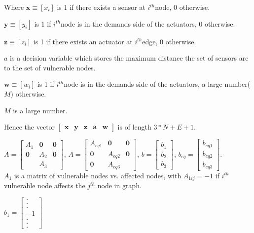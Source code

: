 \documentclass[authoryear,preprint,review,12pt]{elsarticle}
\begin{document}
Where $\mathbf{x}\equiv[x_{i}]$ is 1 if there exists a sensor at
$i^{th}$node, 0 otherwise.

$\mathbf{y}\equiv[y_{i}]$ is 1 if $i^{th}$node is in the demands
side of the actuators, 0 otherwise.

$\mathbf{z}\equiv[z_{i}]$ is 1 if there exists an actuator at $i^{th}$edge,
0 otherwise.

$a$ is a decision variable which stores the maximum distance the
set of sensors are to the set of vulnerable nodes.

$\mathbf{w}\equiv[w_{i}]$ is 1 if $i^{th}$node is in the demands
side of the actuators, a large number($M$) otherwise.

$M$ is a large number.

Hence the vector $\left[\mathbf{\begin{array}{ccccc}
\mathbf{x} & y & z & a & w\end{array}}\right]$ is of length $3*N+E+1$.

$A=\left[\begin{array}{ccc}
A_{1} & \mathbf{0} & \mathbf{0}\\
\mathbf{0} & A_{2} & \mathbf{0}\\
\mathbf{} & A_{3}
\end{array}\right]$, $A=\left[\begin{array}{ccc}
A_{eq1} & \mathbf{0} & \mathbf{0}\\
\mathbf{0} & A_{eq2} & \mathbf{0}\\
\mathbf{0} & A_{eq3}
\end{array}\right]$, $b=\left[\begin{array}{c}
b_{1}\\
b_{2}\\
b_{3}
\end{array}\right]$, $b_{eq}=\left[\begin{array}{c}
b_{eq1}\\
b_{eq2}\\
b_{eq3}
\end{array}\right]$.\\

$A_{1}$ is a matrix of vulnerable nodes vs. affected nodes, with
$A_{1ij}=-1$ if $i^{th}$ vulnerable node affects the $j^{th}$ node
in graph.

$b_{1}=\left[\begin{array}{c}
.\\
.\\
.\\
-1\\
.\\
.\\
.
\end{array}\right]$
\end{document}
